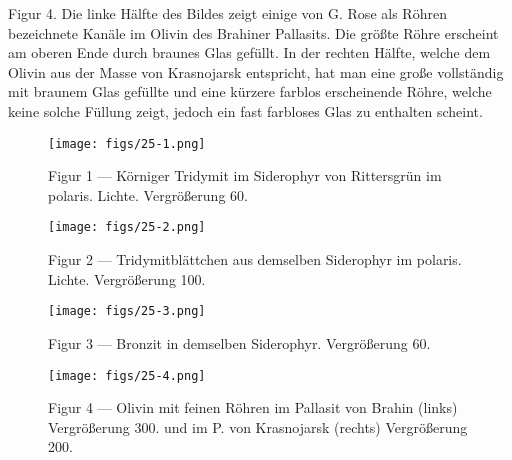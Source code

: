 \documentclass[a4paper, 12pt, oneside]{article}
\begin{document}
Figur 4. Die linke Hälfte des Bildes zeigt einige von G. Rose als Röhren bezeichnete Kanäle im Olivin des Brahiner Pallasits. Die größte Röhre erscheint am oberen Ende durch braunes Glas gefüllt. In der rechten Hälfte, welche dem Olivin aus der Masse von Krasnojarsk entspricht, hat man eine große vollständig mit braunem Glas gefüllte und eine kürzere farblos erscheinende Röhre, welche keine solche Füllung zeigt, jedoch ein fast farbloses Glas zu enthalten scheint.
\clearpage

\vspace*{\fill}
\begin{figure}[H]
\centering
\texttt{[image: figs/25-1.png]}
\caption{\small Figur 1 --- Körniger Tridymit im Siderophyr von Rittersgrün im polaris. Lichte. Vergrößerung 60.}
\end{figure}
\vspace*{\fill}
\clearpage

\vspace*{\fill}
\begin{figure}[H]
\centering
\texttt{[image: figs/25-2.png]}
\caption{\small Figur 2 --- Tridymitblättchen aus demselben Siderophyr im polaris. Lichte. Vergrößerung 100.}
\end{figure}
\vspace*{\fill}
\clearpage

\vspace*{\fill}
\begin{figure}[H]
\centering
\texttt{[image: figs/25-3.png]}
\caption{\small Figur 3 --- Bronzit in demselben Siderophyr. Vergrößerung 60.}
\end{figure}
\vspace*{\fill}
\clearpage

\vspace*{\fill}
\begin{figure}[H]
\centering
\texttt{[image: figs/25-4.png]}
\caption{\small Figur 4 --- Olivin mit feinen Röhren im Pallasit von Brahin (links) Vergrößerung 300. und im P. von Krasnojarsk (rechts) Vergrößerung 200.}
\end{figure}
\vspace*{\fill}
\clearpage
\end{document}
